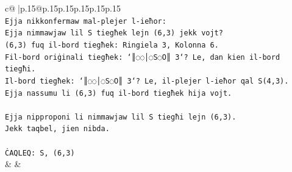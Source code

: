 \documentclass{article}
\begin{document}
{\begin{supertabular}{c@{$\;$}|p{.15\linewidth}@{}p{.15\linewidth}p{.15\linewidth}p{.15\linewidth}p{.15\linewidth}p{.15\linewidth}}
{{{\\ 
\texttt{Ejja nikkonfermaw mal{-}plejer l{-}ieħor:} \\
\texttt{Ejja nimmawjaw lil S tiegħek lejn (6,3) jekk vojt?} \\
\texttt{(6,3) fuq il{-}bord tiegħek: Ringiela 3, Kolonna 6.} \\
\texttt{Fil{-}bord oriġinali tiegħek: `║◌◌│◌S◌O║ 3`? Le, dan kien il{-}bord tiegħi.} \\
\texttt{Il{-}bord tiegħek: `║◌◌│◌S◌O║ 3`? Le, il{-}plejer l{-}ieħor qal S(4,3).} \\
\texttt{Ejja nassumu li (6,3) fuq il{-}bord tiegħek hija vojt.} \\
\\ 
\texttt{Ejja nipproponi li nimmawjaw lil S tiegħi lejn (6,3).} \\
\texttt{Jekk taqbel, jien nibda.} \\
\\ 
\texttt{ĊAQLEQ: S, (6,3)} \\
            }
        }
    }
    & & \\ \\


\end{supertabular}}
\end{document}
